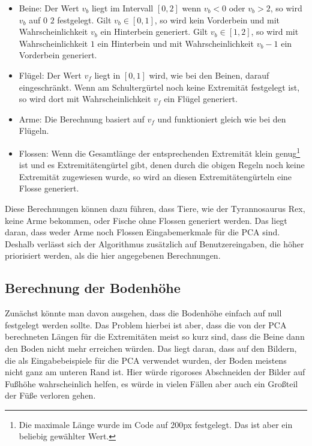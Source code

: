 \begin{itemize}
 \item Beine: Der Wert $v_b$ liegt im Intervall $[0, 2]$ \bzw wenn $v_b < 0$ oder $v_b > 2$, so wird $v_b$ auf $0$ \bzw $2$ festgelegt. Gilt $v_b \in [0, 1]$, so wird kein Vorderbein und mit Wahrscheinlichkeit $v_b$ ein Hinterbein generiert. Gilt $v_b \in [1, 2]$, so wird mit Wahrscheinlichkeit $1$ ein Hinterbein und mit Wahrscheinlichkeit $v_b - 1$ ein Vorderbein generiert.
 
 \item Flügel: Der Wert $v_f$ liegt in $[0, 1]$ \bzw wird, wie bei den Beinen, darauf eingeschränkt. Wenn am Schultergürtel noch keine Extremität festgelegt ist, so wird dort mit Wahrscheinlichkeit $v_f$ ein Flügel generiert.
 
 \item Arme: Die Berechnung basiert auf $v_f$ und funktioniert gleich wie bei den Flügeln.
 
 \item Flossen: Wenn die Gesamtlänge der entsprechenden Extremität klein genug\footnote{Die maximale Länge wurde im Code auf 200px festgelegt. Das ist aber ein beliebig gewählter Wert.} ist und es Extremitätengürtel gibt, denen durch die obigen Regeln noch keine Extremität zugewiesen wurde, so wird an diesen Extremitätengürteln eine Flosse generiert.
\end{itemize}

Diese Berechnungen können dazu führen, dass Tiere, wie der Tyrannosaurus Rex, keine Arme bekommen, oder Fische ohne Flossen generiert werden. Das liegt daran, dass weder Arme noch Flossen Eingabemerkmale für die PCA sind. Deshalb verlässt sich der Algorithmus zusätzlich auf Benutzereingaben, die höher priorisiert werden, als die hier angegebenen Berechnungen.

\subsection{Berechnung der Bodenhöhe}
\label{floor_height}

Zunächst könnte man davon ausgehen, dass die Bodenhöhe einfach auf null festgelegt werden sollte. Das Problem hierbei ist aber, dass die von der PCA berechneten Längen für die Extremitäten meist so kurz sind, dass die Beine dann den Boden nicht mehr erreichen würden. Das liegt daran, dass auf den Bildern, die als Eingabebeispiele für die PCA verwendet wurden, der Boden meistens nicht ganz am unteren Rand ist. Hier würde rigoroses Abschneiden der Bilder auf Fußhöhe wahrscheinlich helfen, es würde in vielen Fällen aber auch ein Großteil der Füße verloren gehen.


